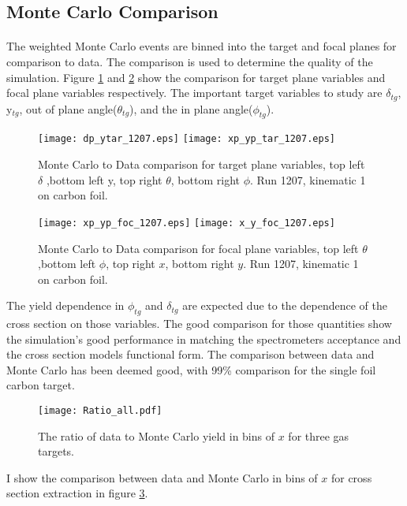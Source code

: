 \subsection{Monte Carlo Comparison}
\paragraph{}The weighted Monte Carlo events are binned into the target and focal planes for comparison to data. The comparison is used to determine the quality of the simulation. Figure \ref{tcomp} and \ref{fcomp} show the comparison for target plane variables and focal plane variables respectively. The important target variables to study are $\delta_{tg}$, y$_{tg}$, out of plane angle($\theta_{tg}$), and the in plane angle($\phi_{tg}$). 
\begin{figure}[h]
	\caption{Monte Carlo to Data comparison for target plane variables, top left $\delta$ ,bottom left y, top right $\theta$, bottom right $\phi$. Run 1207, kinematic 1 on carbon foil.\label{tcomp}}
	{\centering
	\hspace{-10pt}
	\texttt{[image: dp\_ytar\_1207.eps]}
	\texttt{[image: xp\_yp\_tar\_1207.eps]}
}
\end{figure}
\begin{figure}[H]
	\caption{Monte Carlo to Data comparison for focal plane variables, top left $\theta$ ,bottom left $\phi$, top right $x$, bottom right $y$. Run 1207, kinematic 1 on carbon foil. \label{fcomp} }
	{\centering
	\hspace{-10pt}
	\texttt{[image: xp\_yp\_foc\_1207.eps]}
	\texttt{[image: x\_y\_foc\_1207.eps]}}
\end{figure}
The yield dependence in $\phi_{tg}$ and $\delta_{tg}$ are expected due to the dependence of the cross section on those variables. The good comparison for those quantities show the simulation's good performance in matching the spectrometers acceptance and the cross section models functional form. The comparison between data and Monte Carlo has been deemed good, with 99\% comparison for the single foil carbon target. 
\begin{figure}
	\caption{The ratio of data to Monte Carlo yield in bins of $x$ for three gas targets.\label{D_MC_COMP}}
	\texttt{[image: Ratio\_all.pdf]}
\end{figure}
I show the comparison between data and Monte Carlo in bins of $x$ for cross section extraction in figure \ref{D_MC_COMP}.
